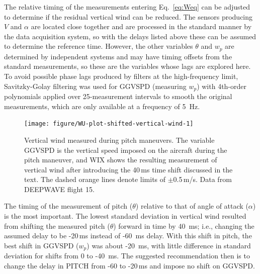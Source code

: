 \documentclass[12pt,twoside,english]{article}\usepackage[]{graphicx}\usepackage[]{color}
\newenvironment{knitrout}{}{} %
\begin{document}
The relative timing of the measurements entering Eq.~\ref{eq:Weq} can be adjusted to determine if the residual vertical wind can be reduced. 
The sensors producing $V$ and $\alpha$ are located close together and are processed in the standard manner by the data acquisition system, so with the delays listed above these can be assumed to determine the reference time.
However, the other variables $\theta$ and $w_{p}$ are determined by independent systems and may have timing offsets from the standard measurements, so these are the variables whose lags are explored here. 
To avoid possible phase lags produced by filters at the high-frequency limit, Savitzky-Golay filtering was used for GGVSPD (measuring $w_p$) with 4th-order polynomials applied over 25-measurement intervals to smooth the original measurements, which are only available at a frequency of 5~Hz. 
\begin{knitrout}\footnotesize
{}\color{fgcolor}\begin{figure}

{\centering \texttt{[image: figure/WU-plot-shifted-vertical-wind-1]} 

}

\caption[Vertical wind measured during pitch maneuvers]{Vertical wind measured during pitch maneuvers. The variable GGVSPD is the vertical speed imposed on the aircraft during the pitch maneuver, and WIX shows the resulting measurement of vertical wind after introducing the 40\,ms time shift discussed in the text. The dashed orange lines denote limits of $\pm$0.5\,m/s. Data from DEEPWAVE flight 15.}\label{fig:plot-shifted-vertical-wind}
\end{figure}


\end{knitrout}
The timing of the measurement of pitch ($\theta$) relative to that of angle of attack ($\alpha$) is the most important. The lowest standard deviation in vertical wind resulted from shifting the measured pitch ($\theta$) forward in time by 40~ms; i.e., changing the assumed delay to be -20\,ms instead of -60~ms delay. With this shift in pitch, 
the best shift in GGVSPD ($w_p$) was about -20~ms, with little difference in standard deviation for shifts from 0 to -40~ms.
The suggested recommendation then is to change the delay in PITCH from -60 to -20\,ms and impose no shift on GGVSPD.
\end{document}
